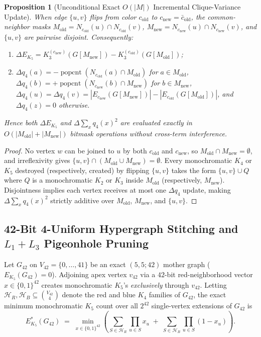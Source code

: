 \documentclass[11pt,a4paper]{article}
\theoremstyle{plain}
\newtheorem{proposition}[theorem]{Proposition}
\theoremstyle{definition}
\DeclareMathOperator{\popcnt}{popcnt}
\begin{document}
\begin{proposition}[Unconditional Exact $O(|M|)$ Incremental Clique-Variance Update]\label{prop:incremental}
When edge $\{u,v\}$ flips from color $c_{\mathrm{old}}$ to $c_{\mathrm{new}} = \bar{c}_{\mathrm{old}}$, the common-neighbor masks $M_{\mathrm{old}} = N_{c_{\mathrm{old}}}(u) \cap N_{c_{\mathrm{old}}}(v)$, $M_{\mathrm{new}} = N_{c_{\mathrm{new}}}(u) \cap N_{c_{\mathrm{new}}}(v)$, and $\{u,v\}$ are pairwise disjoint. Consequently:
\begin{enumerate}
  \item $\Delta E_{K_5} = K_3^{(c_{\mathrm{new}})}(G[M_{\mathrm{new}}]) - K_3^{(c_{\mathrm{old}})}(G[M_{\mathrm{old}}])$;
  \item $\Delta q_4(a) = -\popcnt(N_{c_{\mathrm{old}}}(a) \cap M_{\mathrm{old}})$ for $a \in M_{\mathrm{old}}$, $\Delta q_4(b) = +\popcnt(N_{c_{\mathrm{new}}}(b) \cap M_{\mathrm{new}})$ for $b \in M_{\mathrm{new}}$, $\Delta q_4(u) = \Delta q_4(v) = |E_{c_{\mathrm{new}}}(G[M_{\mathrm{new}}])| - |E_{c_{\mathrm{old}}}(G[M_{\mathrm{old}}])|$, and $\Delta q_4(z) = 0$ otherwise.
\end{enumerate}
Hence both $\Delta E_{K_5}$ and $\Delta \sum_x q_4(x)^2$ are evaluated exactly in $O(|M_{\mathrm{old}}| + |M_{\mathrm{new}}|)$ bitmask operations without cross-term interference.
\end{proposition}
\begin{proof}
No vertex $w$ can be joined to $u$ by both $c_{\mathrm{old}}$ and $c_{\mathrm{new}}$, so $M_{\mathrm{old}} \cap M_{\mathrm{new}} = \emptyset$, and irreflexivity gives $\{u,v\} \cap (M_{\mathrm{old}} \cup M_{\mathrm{new}}) = \emptyset$. Every monochromatic $K_4$ or $K_5$ destroyed (respectively, created) by flipping $\{u,v\}$ takes the form $\{u,v\} \cup Q$ where $Q$ is a monochromatic $K_2$ or $K_3$ inside $M_{\mathrm{old}}$ (respectively, $M_{\mathrm{new}}$). Disjointness implies each vertex receives at most one $\Delta q_4$ update, making $\Delta \sum_x q_4(x)^2$ strictly additive over $M_{\mathrm{old}}$, $M_{\mathrm{new}}$, and $\{u,v\}$.
\end{proof}

\subsection{42-Bit 4-Uniform Hypergraph Stitching and \texorpdfstring{$L_1 + L_3$}{L1 + L3} Pigeonhole Pruning}

Let $G_{42}$ on $V_{42} = \{0,\dots,41\}$ be an exact $(5,5;42)$ mother graph ($E_{K_5}(G_{42}) = 0$). Adjoining apex vertex $v_{42}$ via a $42$-bit red-neighborhood vector $x \in \{0,1\}^{42}$ creates monochromatic $K_5$'s \emph{exclusively} through $v_{42}$. Letting $\mathcal{H}_R, \mathcal{H}_B \subseteq \binom{V_{42}}{4}$ denote the red and blue $K_4$ families of $G_{42}$, the exact minimum monochromatic $K_5$ count over all $2^{42}$ single-vertex extensions of $G_{42}$ is
\begin{equation}\label{eq:stitch-opt}
  E_{K_5}^*(G_{42}) \;=\; \min_{x \in \{0,1\}^{42}} \left( \sum_{S \in \mathcal{H}_R} \prod_{u \in S} x_u \;+\; \sum_{S \in \mathcal{H}_B} \prod_{u \in S} (1 - x_u) \right).
\end{equation}
\end{document}
